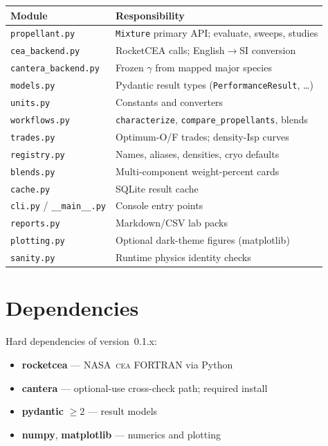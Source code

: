 \documentclass[11pt,a4paper]{report}
\newcommand{\cea}{\textsc{cea}}
\begin{document}
\begin{center}
\begin{tabular}{@{}p{3.6cm}p{10.2cm}@{}}
\toprule
Module & Responsibility \\
\midrule
\texttt{propellant.py} & \texttt{Mixture} primary API; evaluate, sweeps, studies \\
\texttt{cea\_backend.py} & RocketCEA calls; English$\to$SI conversion \\
\texttt{cantera\_backend.py} & Frozen $\gamma$ from mapped major species \\
\texttt{models.py} & Pydantic result types (\texttt{PerformanceResult}, \ldots) \\
\texttt{units.py} & Constants and converters \\
\texttt{workflows.py} & \texttt{characterize}, \texttt{compare\_propellants}, blends \\
\texttt{trades.py} & Optimum-O/F trades; density-Isp curves \\
\texttt{registry.py} & Names, aliases, densities, cryo defaults \\
\texttt{blends.py} & Multi-component weight-percent cards \\
\texttt{cache.py} & SQLite result cache \\
\texttt{cli.py} / \texttt{\_\_main\_\_.py} & Console entry points \\
\texttt{reports.py} & Markdown/CSV lab packs \\
\texttt{plotting.py} & Optional dark-theme figures (matplotlib) \\
\texttt{sanity.py} & Runtime physics identity checks \\
\bottomrule
\end{tabular}
\end{center}

\section{Dependencies}

Hard dependencies of version~0.1.x:

\begin{itemize}[leftmargin=*]
  \item \textbf{rocketcea} --- NASA~\cea{} FORTRAN via Python~\citep{rocketcea}
  \item \textbf{cantera} --- optional-use cross-check path; required install~\citep{cantera}
  \item \textbf{pydantic} $\geq 2$ --- result models
  \item \textbf{numpy}, \textbf{matplotlib} --- numerics and plotting
\end{itemize}
\end{document}
